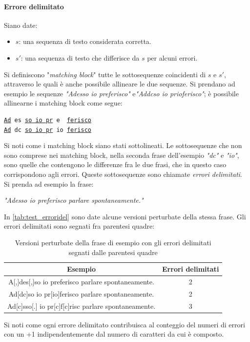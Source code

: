 \paragraph{Errore delimitato} Siano date:
\begin{itemize}
\item $s$: una sequenza di testo considerata corretta.
\item $s\prime$: una sequenza di testo che differisce da $s$ per alcuni errori. 
\end{itemize}
Si definiscono "\textit{matching block}" tutte le sottosequenze coincidenti di $s$ e $s\prime$, attraverso le quali è anche possibile allineare le due sequenze. Si prendano ad esempio le sequenze \textit{"Adesso io preferisco"} e\textit{"Addcso io prioferisco"}; è possibile allinearne i matching block come segue:
\begin{center}
\noindent
\texttt{\underline{Ad} es \underline{so io pr} e\ \ \underline{ferisco}}\\
\texttt{\underline{Ad} dc \underline{so io pr} io \underline{ferisco}}
\end{center}
Si noti come i matching block siano stati sottolineati. Le sottosequenze che non sono comprese nei matching block, nella seconda frase dell'esempio \textit{"dc"} e \textit{"io"}, sono quelle che contengono le differenze fra le due frasi, che in questo caso corrispondono agli errori. Queste sottosequenze sono chiamate \textit{errori delimitati}.\\
Si prenda ad esempio la frase:
\begin{center}
\textit{"Adesso io preferisco parlare spontaneamente."}
\end{center}
In \autoref{tab:test_erroridel} sono date alcune versioni perturbate della stessa frase. Gli errori delimitati sono segnati fra parentesi quadre:

\begin{table}[H]
\centering
\begin{tabular}{cc}
\textbf{Esempio} & \textbf{Errori delimitati}\\
\hline
A[,]des[,]so io preferisco parlare spontaneamente. & 2 \\
Ad[dc]so io pr[io]ferisco parlare spontaneamente. & 2 \\
Ad[c]sso[.] io pr[c]f[c]risc parlare spontaneamente. & 3\\
\end{tabular}
\caption{Versioni perturbate della frase di esempio con gli errori delimitati segnati dalle parentesi quadre}
\label{tab:test_erroridel}
\end{table}
\noindent
Si noti come ogni errore delimitato contribuisca al conteggio del numeri di errori con un +1 indipendentemente dal numero di caratteri da cui è composto.

